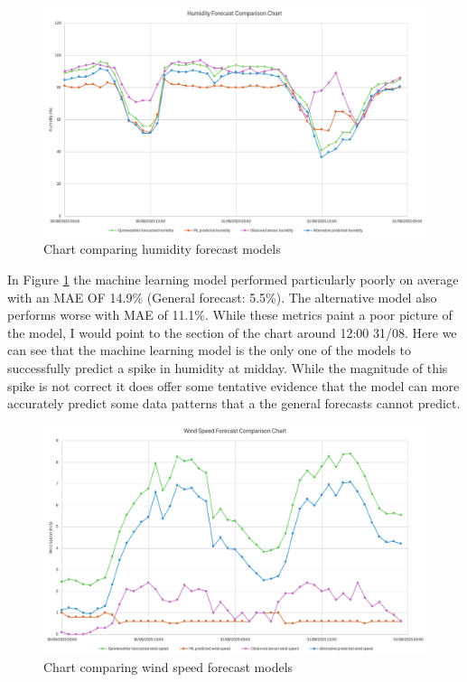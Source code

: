 \begin{figure}[H]
    \centering
    \includegraphics[width=1\textwidth]{contents/part-4/fig4/humidity-graph.png}
    \caption{Chart comparing humidity forecast models}
    \label{fig:humidity-chart}
\end{figure}

In Figure \ref{fig:humidity-chart} the machine learning model performed
particularly poorly on average with an MAE OF 14.9\% (General forecast: 5.5\%).
The alternative model also performs worse with MAE of 11.1\%. While these
metrics paint a poor picture of the model, I would point to the section of the
chart around 12:00 31/08. Here we can see that the machine learning model is the
only one of the models to successfully predict a spike in humidity at midday.
While the magnitude of this spike is not correct it does offer some tentative
evidence that the model can more accurately predict some data patterns that a
the general forecasts cannot predict.

\begin{figure}[H]
    \centering
    \includegraphics[width=1\textwidth]{contents/part-4/fig4/wind-speed-graph.png}
    \caption{Chart comparing wind speed forecast models}
    \label{fig:wind-chart}
\end{figure}

